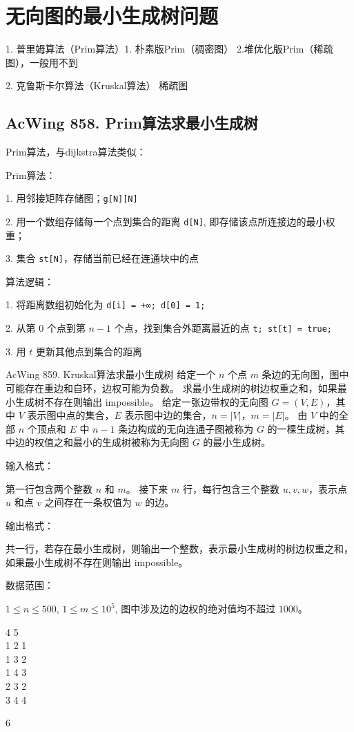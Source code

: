 \section{无向图的最小生成树问题}

1. 普里姆算法（Prim算法）1. 朴素版Prim（稠密图） 2.堆优化版Prim（稀疏图），一般用不到

2. 克鲁斯卡尔算法（Kruskal算法） 稀疏图

\subsection{AcWing 858. Prim算法求最小生成树}
Prim算法，与dijkstra算法类似：

Prim算法：

1. 用邻接矩阵存储图；\lstinline{g[N][N]}

2. 用一个数组存储每一个点到集合的距离 \lstinline{d[N]}, 即存储该点所连接边的最小权重；

3. 集合 \lstinline{st[N]}，存储当前已经在连通块中的点

算法逻辑：

1. 将距离数组初始化为 \lstinline{d[i] = +∞; d[0] = 1;}

2. 从第 $0$ 个点到第 $n - 1$ 个点，找到集合外距离最近的点 \lstinline{t; st[t] = true;}

3. 用 $t$ 更新其他点到集合的距离

\begin{titledbox}{AcWing 859. Kruskal算法求最小生成树}
    给定一个 $n$ 个点 $m$ 条边的无向图，图中可能存在重边和自环，边权可能为负数。 求最小生成树的树边权重之和，如果最小生成树不存在则输出 impossible。 给定一张边带权的无向图 $G=(V, E)$，其中 $V$ 表示图中点的集合，$E$ 表示图中边的集合，$n=|V|$，$m=|E|$。 由 $V$ 中的全部 $n$ 个顶点和 $E$ 中 $n-1$ 条边构成的无向连通子图被称为 $G$ 的一棵生成树，其中边的权值之和最小的生成树被称为无向图 $G$ 的最小生成树。

    输入格式：

    第一行包含两个整数 $n$ 和 $m$。 接下来 $m$ 行，每行包含三个整数 $u,v,w$，表示点 $u$ 和点 $v$ 之间存在一条权值为 $w$ 的边。

    输出格式：

    共一行，若存在最小生成树，则输出一个整数，表示最小生成树的树边权重之和，如果最小生成树不存在则输出 impossible。

    数据范围：

    $1 \le n \le 500$, $1 \le m \le 10^5$, 图中涉及边的边权的绝对值均不超过 $1000$。

    \begin{inputblock}
        4 5 \\
        1 2 1 \\
        1 3 2 \\
        1 4 3 \\
        2 3 2 \\
        3 4 4
    \end{inputblock}
    \begin{outputblock}
        6
    \end{outputblock}
\end{titledbox}

